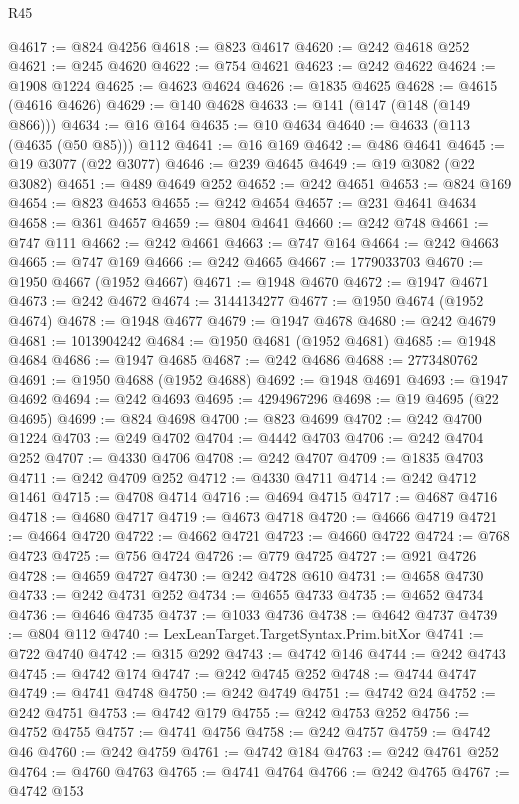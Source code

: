\begin{lexlean}{R45}
\begin{coremodule}
{@4617 := @824 @4256
@4618 := @823 @4617
@4620 := @242 @4618 @252
@4621 := @245 @4620
@4622 := @754 @4621
@4623 := @242 @4622
@4624 := @1908 @1224
@4625 := @4623 @4624
@4626 := @1835 @4625
@4628 := @4615 (@4616 @4626)
@4629 := @140 @4628
@4633 := @141 (@147 (@148 (@149 @866)))
@4634 := @16 @164
@4635 := @10 @4634
@4640 := @4633 (@113 (@4635 (@50 @85))) @112
@4641 := @16 @169
@4642 := @486 @4641
@4645 := @19 @3077 (@22 @3077)
@4646 := @239 @4645
@4649 := @19 @3082 (@22 @3082)
@4651 := @489 @4649 @252
@4652 := @242 @4651
@4653 := @824 @169
@4654 := @823 @4653
@4655 := @242 @4654
@4657 := @231 @4641 @4634
@4658 := @361 @4657
@4659 := @804 @4641
@4660 := @242 @748
@4661 := @747 @111
@4662 := @242 @4661
@4663 := @747 @164
@4664 := @242 @4663
@4665 := @747 @169
@4666 := @242 @4665
@4667 := 1779033703
@4670 := @1950 @4667 (@1952 @4667)
@4671 := @1948 @4670
@4672 := @1947 @4671
@4673 := @242 @4672
@4674 := 3144134277
@4677 := @1950 @4674 (@1952 @4674)
@4678 := @1948 @4677
@4679 := @1947 @4678
@4680 := @242 @4679
@4681 := 1013904242
@4684 := @1950 @4681 (@1952 @4681)
@4685 := @1948 @4684
@4686 := @1947 @4685
@4687 := @242 @4686
@4688 := 2773480762
@4691 := @1950 @4688 (@1952 @4688)
@4692 := @1948 @4691
@4693 := @1947 @4692
@4694 := @242 @4693
@4695 := 4294967296
@4698 := @19 @4695 (@22 @4695)
@4699 := @824 @4698
@4700 := @823 @4699
@4702 := @242 @4700 @1224
@4703 := @249 @4702
@4704 := @4442 @4703
@4706 := @242 @4704 @252
@4707 := @4330 @4706
@4708 := @242 @4707
@4709 := @1835 @4703
@4711 := @242 @4709 @252
@4712 := @4330 @4711
@4714 := @242 @4712 @1461
@4715 := @4708 @4714
@4716 := @4694 @4715
@4717 := @4687 @4716
@4718 := @4680 @4717
@4719 := @4673 @4718
@4720 := @4666 @4719
@4721 := @4664 @4720
@4722 := @4662 @4721
@4723 := @4660 @4722
@4724 := @768 @4723
@4725 := @756 @4724
@4726 := @779 @4725
@4727 := @921 @4726
@4728 := @4659 @4727
@4730 := @242 @4728 @610
@4731 := @4658 @4730
@4733 := @242 @4731 @252
@4734 := @4655 @4733
@4735 := @4652 @4734
@4736 := @4646 @4735
@4737 := @1033 @4736
@4738 := @4642 @4737
@4739 := @804 @112
@4740 := LexLeanTarget.TargetSyntax.Prim.bitXor
@4741 := @722 @4740
@4742 := @315 @292
@4743 := @4742 @146
@4744 := @242 @4743
@4745 := @4742 @174
@4747 := @242 @4745 @252
@4748 := @4744 @4747
@4749 := @4741 @4748
@4750 := @242 @4749
@4751 := @4742 @24
@4752 := @242 @4751
@4753 := @4742 @179
@4755 := @242 @4753 @252
@4756 := @4752 @4755
@4757 := @4741 @4756
@4758 := @242 @4757
@4759 := @4742 @46
@4760 := @242 @4759
@4761 := @4742 @184
@4763 := @242 @4761 @252
@4764 := @4760 @4763
@4765 := @4741 @4764
@4766 := @242 @4765
@4767 := @4742 @153
}
\end{coremodule}
\end{lexlean}
